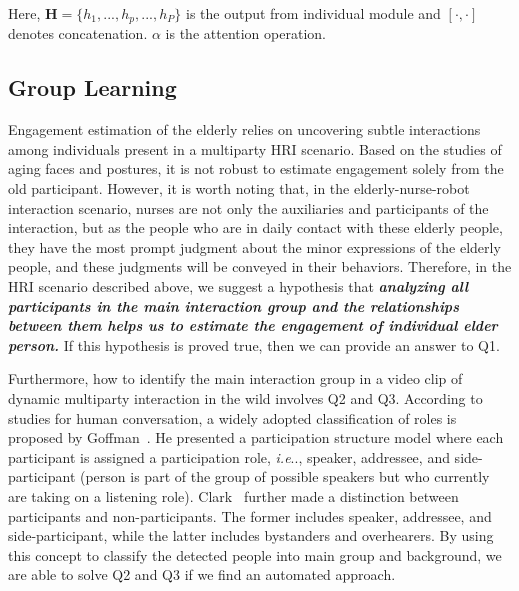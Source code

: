 \documentclass[10pt,journal,compsoc]{IEEEtran}
\makeatletter
\DeclareRobustCommand\onedot{\futurelet\@let@token\@onedot}
\def\@onedot{\ifx\@let@token.\else.\null\fi\xspace}
\def\ie{\emph{i.e}\onedot} \def\Ie{\emph{I.e}\onedot}
\makeatother
\begin{document}
Here, $\mathbf{H} = \{h_1, ..., h_p, ..., h_P\}$ is the output from individual module and $\left[\cdot, \cdot\right]$ denotes concatenation. $\alpha$ is the attention operation.

\subsection{Group Learning}
\label{subs:Group_Learning}

Engagement estimation of the elderly relies on uncovering subtle interactions among individuals present in a multiparty HRI scenario. Based on the studies of aging faces and postures, it is not robust to estimate engagement solely from the old participant. However, it is worth noting that, in the elderly-nurse-robot interaction scenario, nurses are not only the auxiliaries and participants of the interaction, but as the people who are in daily contact with these elderly people, they have the most prompt judgment about the minor expressions of the elderly people, and these judgments will be conveyed in their behaviors. Therefore, in the HRI scenario described above, we suggest a hypothesis that \textbf{\textit{analyzing all participants in the main interaction group and the relationships between them helps us to estimate the engagement of individual elder person.}} If this hypothesis is proved true, then we can provide an answer to Q1.

Furthermore, how to identify the main interaction group in a video clip of dynamic multiparty interaction in the wild involves Q2 and Q3. According to studies for human conversation, a widely adopted classification of roles is proposed by Goffman~\cite{Goffman1981Forms}. He presented a participation structure model where each participant is assigned a participation role, \ie, speaker, addressee, and side-participant (person is part of the group of possible speakers but who currently are taking on a listening role). Clark~\cite{Clark1996Using} further made a distinction between participants and non-participants. The former includes speaker, addressee, and side-participant, while the latter includes bystanders and overhearers. By using this concept to classify the detected people into main group and background, we are able to solve Q2 and Q3 if we find an automated approach.
\end{document}
